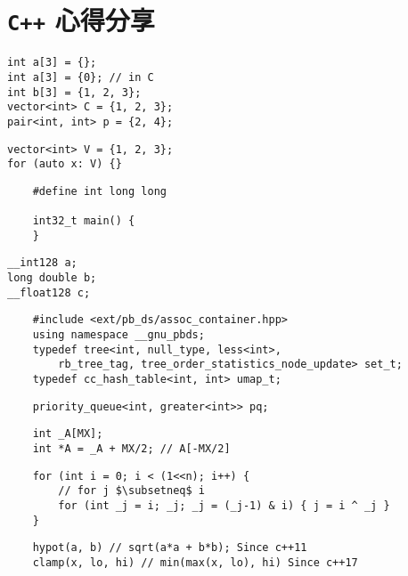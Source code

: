 \documentclass[standalone]{beamer}
\begin{document}
\section{\texttt{C++} 心得分享}

\begin{frame}[fragile]{}
  \begin{verbatim}
int a[3] = {};
int a[3] = {0}; // in C
int b[3] = {1, 2, 3};
vector<int> C = {1, 2, 3};
pair<int, int> p = {2, 4};
  \end{verbatim}
  \pause

  \begin{verbatim}
vector<int> V = {1, 2, 3};
for (auto x: V) {}
  \end{verbatim}
\end{frame}

\begin{frame}[fragile]{}
  \begin{verbatim}
    #define int long long
    
    int32_t main() {
    }
  \end{verbatim}
  \pause

  \begin{verbatim}
__int128 a;
long double b;
__float128 c;
  \end{verbatim}
\end{frame}

\begin{frame}[fragile]{}
  \begin{verbatim}
    #include <ext/pb_ds/assoc_container.hpp>
    using namespace __gnu_pbds;
    typedef tree<int, null_type, less<int>,
        rb_tree_tag, tree_order_statistics_node_update> set_t;
    typedef cc_hash_table<int, int> umap_t;
  \end{verbatim}
  \pause

  \begin{verbatim}
    priority_queue<int, greater<int>> pq;
  \end{verbatim}
\end{frame}

\begin{frame}[fragile]{}
  \begin{verbatim}
    int _A[MX];
    int *A = _A + MX/2; // A[-MX/2]
  \end{verbatim}
  \pause

  \begin{verbatim}
    for (int i = 0; i < (1<<n); i++) {
        // for j $\subsetneq$ i
        for (int _j = i; _j; _j = (_j-1) & i) { j = i ^ _j }
    }
  \end{verbatim}
  \pause

  \begin{verbatim}
    hypot(a, b) // sqrt(a*a + b*b); Since c++11
    clamp(x, lo, hi) // min(max(x, lo), hi) Since c++17
  \end{verbatim}
\end{frame}
\end{document}
